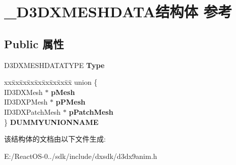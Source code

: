 \hypertarget{struct___d3_d_x_m_e_s_h_d_a_t_a}{}\section{\+\_\+\+D3\+D\+X\+M\+E\+S\+H\+D\+A\+T\+A结构体 参考}
\label{struct___d3_d_x_m_e_s_h_d_a_t_a}
\subsection*{Public 属性}
\begin{DoxyCompactItemize}
\item 
\mbox{\label{struct___d3_d_x_m_e_s_h_d_a_t_a_a49ff67d216884a37f72668b07e966e23}} 
D3\+D\+X\+M\+E\+S\+H\+D\+A\+T\+A\+T\+Y\+PE {\bfseries Type}
\item 
\mbox{\label{struct___d3_d_x_m_e_s_h_d_a_t_a_a022a23f0d0ba3a2f96a37fba53a5618e}} 
\begin{tabbing}
xx\=xx\=xx\=xx\=xx\=xx\=xx\=xx\=xx\=\kill
union \{\\
\>ID3DXMesh $\ast$ {\bfseries pMesh}\\
\>ID3DXPMesh $\ast$ {\bfseries pPMesh}\\
\>ID3DXPatchMesh $\ast$ {\bfseries pPatchMesh}\\
\} {\bfseries DUMMYUNIONNAME}\\

\end{tabbing}\end{DoxyCompactItemize}


该结构体的文档由以下文件生成\+:\begin{DoxyCompactItemize}
\item 
E\+:/\+React\+O\+S-\/0../sdk/include/dxsdk/d3dx9anim.\+h\end{DoxyCompactItemize}
